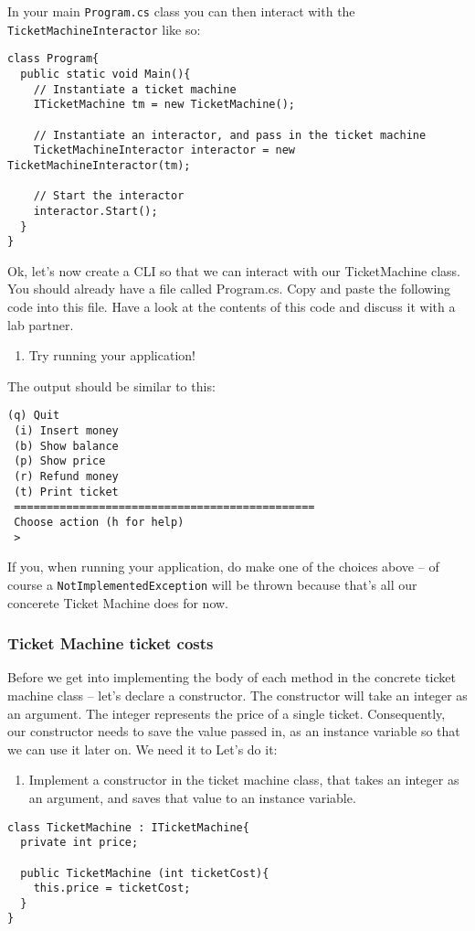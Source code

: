 \documentclass{article}
\newcounter{stepcounter}
\newenvironment{steps}{ 
  \begin{enumerate}[label=\color{red}Step \thesection-\theenumi)]
    \setcounter{enumi}{\value{stepcounter}}
}{
  \setcounter{stepcounter}{\value{enumi}}
  \end{enumerate}
}
\begin{document}
In your main \texttt{Program.cs} class you can then interact with the \texttt{TicketMachineInteractor} like so:

\begin{lstlisting}
class Program{
  public static void Main(){
    // Instantiate a ticket machine
    ITicketMachine tm = new TicketMachine();

    // Instantiate an interactor, and pass in the ticket machine
    TicketMachineInteractor interactor = new TicketMachineInteractor(tm);

    // Start the interactor
    interactor.Start();
  }
}
\end{lstlisting}

Ok, let’s now create a CLI so that we can interact with our TicketMachine class. You should already have a file called Program.cs. Copy and paste the following code into this file. Have a look at the contents of this code and discuss it with a lab partner.

\begin{steps}
\item Try running your application!
\end{steps}
The output should be similar to this:

\begin{lstlisting}[style=terminal]
 (q) Quit
 (i) Insert money
 (b) Show balance
 (p) Show price
 (r) Refund money
 (t) Print ticket
 ==============================================
 Choose action (h for help)
 >
\end{lstlisting}
If you, when running your application, do make one of the choices above -- of course a \texttt{NotImplementedException} will be thrown because that's all our concerete Ticket Machine does for now.




\subsubsection{Ticket Machine ticket costs}
Before we get into implementing the body of each method in the concrete ticket machine class -- let's declare a constructor. The constructor will take an integer as an argument. The integer represents the price of a single ticket. Consequently, our constructor needs to save the value passed in, as an instance variable so that we can use it later on. We need it to  Let's do it:
\begin{steps}
\item Implement a constructor in the ticket machine class, that takes an integer as an argument, and saves that value to an instance variable.
\end{steps}
\begin{lstlisting}
class TicketMachine : ITicketMachine{
  private int price;

  public TicketMachine (int ticketCost){
    this.price = ticketCost;
  }
}
\end{lstlisting}
\end{document}
